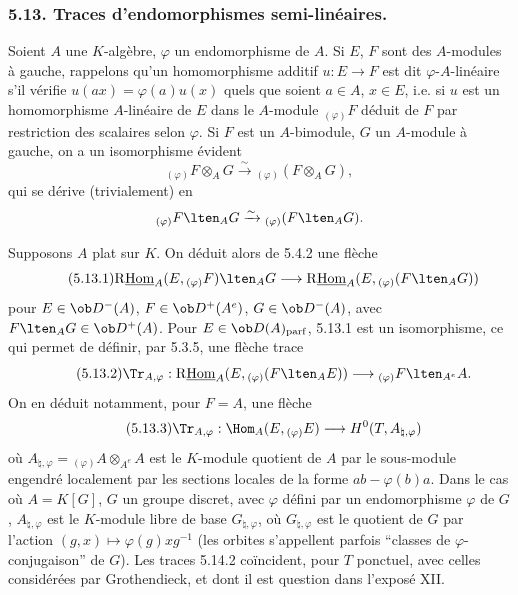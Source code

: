 \subsubsection*{5.13. Traces d'endomorphismes semi-linéaires.}

Soient $A$ une $K$-algèbre, $\varphi$ un endomorphisme de $A$. Si $E$, $F$ sont des $A$-modules à gauche, rappelons qu'un homomorphisme additif $u:E\to F$ est dit $\varphi$-$A$-linéaire s'il vérifie $u(ax)=\varphi(a)u(x)$ quels que soient $a\in A$, $x\in E$, i.e. si $u$ est un homomorphisme $A$-linéaire de $E$ dans le $A$-module ${}_{(\varphi)}F$ déduit de $F$ par restriction des scalaires selon $\varphi$. Si $F$ est un $A$-bimodule,
$G$ un $A$-module à gauche, on a un isomorphisme évident
\[
{}_{(\varphi)}F\otimes_AG\xrightarrow{\sim}{}_{(\varphi)}(F\otimes_AG),
\]
qui se dérive (trivialement) en
\[
{}_{(\varphi)}F\lten_AG\xrightarrow{\sim}{}_{(\varphi)}(F\lten_AG).
\]

Supposons $A$ plat sur $K$. On déduit alors de 5.4.2 une flèche
\begin{equation}\tag{5.13.1}
\mathrm{R}\underline{\mathrm{Hom}}_A(E,{}_{(\varphi)}F)\lten_AG\longrightarrow\mathrm{R}\underline{\mathrm{Hom}}_A(E,{}_{(\varphi)}(F\lten_AG))
\end{equation}
pour $E\in\ob D^-(A)$, $F\in\ob D^+(A^e)$, $G\in\ob D^-(A)$, avec $F\lten_AG\in\ob D^+(A)$. Pour $E\in\ob D(A)_{\mathrm{parf}}$, 5.13.1 est un isomorphisme, ce qui permet de définir, par 5.3.5, une flèche trace
\begin{equation}\tag{5.13.2}
\Tr_{A,\varphi}:\mathrm{R}\underline{\mathrm{Hom}}_A(E,{}_{(\varphi)}(F\lten_AE))\longrightarrow {}_{(\varphi)}F\lten_{A^e}A.
\end{equation}
On en déduit notamment, pour $F=A$, une flèche
\begin{equation}\tag{5.13.3}
\Tr_{A,\varphi}:\Hom_A(E,{}_{(\varphi)}E)\longrightarrow H^0(T,A_{\natural,\varphi})
\end{equation}
où $A_{\natural,\varphi}={}_{(\varphi)}A\otimes_{A^e}A$ est le $K$-module quotient de $A$ par le sous-module engendré localement par les sections locales de la forme $ab-\varphi(b)a$. Dans le cas où $A=K[G]$, $G$ un groupe discret, avec $\varphi$ défini par un endomorphisme $\varphi$ de $G$, $A_{\natural,\varphi}$ est le $K$-module libre de base $G_{\natural,\varphi}$, où $G_{\natural,\varphi}$ est le quotient de $G$ par l'action $(g,x)\mapsto\varphi(g)xg^{-1}$ (les orbites s'appellent parfois ``classes de $\varphi$-conjugaison'' de $G$). Les traces 5.14.2 coïncident, pour $T$ ponctuel, avec celles considérées par Grothendieck, et dont il est question dans l'exposé XII.

